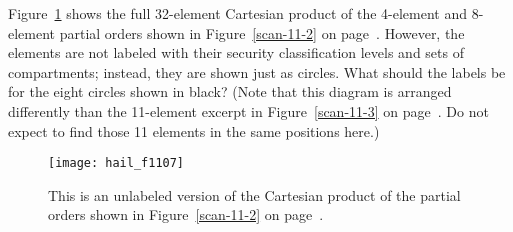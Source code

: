 \begin{chapterEnumerate}
\item
Figure~\ref{cartesian-product-skeleton} shows the full 32-element
Cartesian product of the 4-element and 8-element partial orders shown
in Figure~\ref{scan-11-2} on page~\pageref{scan-11-2}.  However, the
elements are not labeled with their security classification levels and
sets of compartments; instead, they are shown just as circles.  What
should the labels be for the eight circles shown in black?  (Note that
this diagram is arranged differently than the 11-element excerpt in
Figure~\ref{scan-11-3} on page~\pageref{scan-11-3}.  Do not expect to
find those 11 elements in the same positions here.)
\begin{figure}
\centerline{\texttt{[image: hail\_f1107]}}
\caption{This is an unlabeled version of the Cartesian product of the partial
  orders shown in Figure~\ref{scan-11-2} on page~\pageref{scan-11-2}.}
\label{cartesian-product-skeleton}
\end{figure}


\end{chapterEnumerate}
